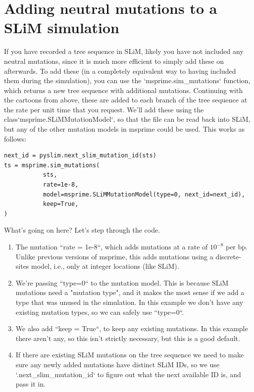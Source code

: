 \documentclass[12pt]{article}
\begin{document}
\section{Adding neutral mutations to a SLiM simulation}


If you have recorded a tree sequence in SLiM, likely you have not included any neutral mutations,
since it is much more efficient to simply add these on afterwards.
To add these (in a completely equivalent way to having included them during the simulation),
you can use the `msprime.sim\_mutations` function, which returns a new tree sequence with additional mutations.
Continuing with the cartoons from above, these are added to each branch of the tree sequence
at the rate per unit time that you request.
We'll add these using the {class}`msprime.SLiMMutationModel`, so that the file can be read back into SLiM,
but any of the other mutation models in msprime could be used.
This works as follows:
\begin{verbatim}
next_id = pyslim.next_slim_mutation_id(sts)
ts = msprime.sim_mutations(
           sts,
           rate=1e-8,
           model=msprime.SLiMMutationModel(type=0, next_id=next_id),
           keep=True,
)
\end{verbatim}


What's going on here? Let's step through the code.

\begin{enumerate}
    \item The mutation ``rate = 1e-8``, which adds mutations at a rate of $10^{-8}$ per bp.
    Unlike previous versions of msprime, this adds mutations using a discrete-sites model,
    i.e., only at integer locations (like SLiM).

\item We're passing ``type=0`` to the mutation model.
    This is because SLiM mutations need a "mutation type",
    and it makes the most sense if we add a type that was unused in the simulation.
    In this example we don't have any existing mutation types, so we can safely use ``type=0``.

\item We also add ``keep = True``, to keep any existing mutations.
    In this example there aren't any, so this isn't strictly necessary,
    but this is a good default.

\item If there are existing SLiM mutations on the tree sequence we need to
    make sure any newly added mutations have distinct SLiM IDs,
    so we use `.next\_slim\_mutation\_id` to figure out
    what the next available ID is, and pass it in.

\end{enumerate}
\end{document}
